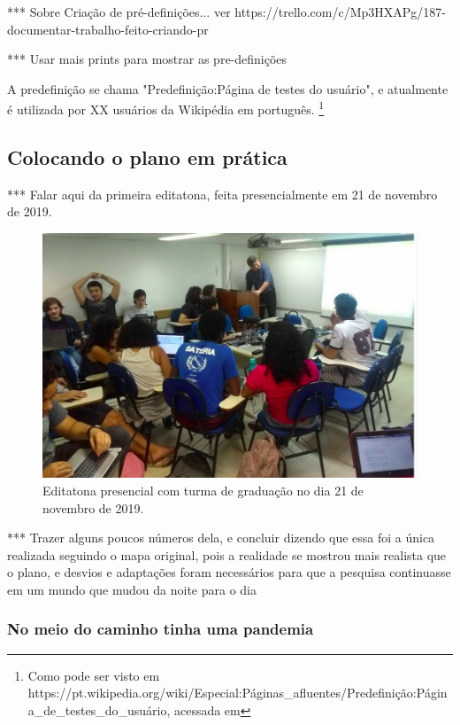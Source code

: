 *** Sobre Criação de pré-definições... ver https://trello.com/c/Mp3HXAPg/187-documentar-trabalho-feito-criando-pr%

*** Usar mais prints para mostrar as pre-definições


A predefinição se chama "Predefinição:Página de testes do usuário", e atualmente é utilizada por XX usuários da Wikipédia em português. \footnote{Como pode ser visto em https://pt.wikipedia.org/wiki/Especial:Páginas_afluentes/Predefinição:Página_de_testes_do_usuário, acessada em }

\subsection{Colocando o plano em prática}

***  Falar aqui da primeira editatona, feita presencialmente em 21 de novembro de 2019.

\begin{figure}[H]
    \centering
    \includegraphics[width=1\textwidth]{Images/editatona_presencial.png}
    \caption{Editatona presencial com turma de graduação no dia 21 de novembro de 2019.}
    \label{fig:editatona_presencial}
\end{figure}

***  Trazer alguns poucos números dela, e concluir dizendo que essa foi a única realizada seguindo o mapa original, pois a realidade se mostrou mais realista que o plano, e desvios e adaptações foram necessários para que a pesquisa continuasse em um mundo que mudou da noite para o dia


\subsubsection{No meio do caminho tinha uma pandemia}

